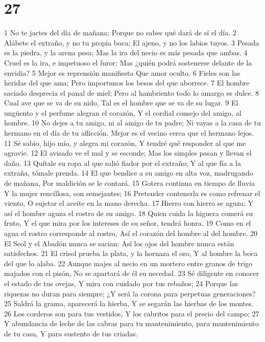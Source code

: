 \chapter{27}

1 No te jactes del día de mañana;
Porque no sabes qué dará de sí el día. 
2 Alábete el extraño, y no tu propia boca;
El ajeno, y no los labios tuyos.
3 Pesada es la piedra, y la arena pesa;
Mas la ira del necio es más pesada que ambas.
4 Cruel es la ira, e impetuoso el furor;
Mas ¿quién podrá sostenerse delante de la envidia?
5 Mejor es reprensión manifiesta
Que amor oculto.
6 Fieles son las heridas del que ama;
Pero importunos los besos del que aborrece.
7 El hombre saciado desprecia el panal de miel;
Pero al hambriento todo lo amargo es dulce.
8 Cual ave que se va de su nido,
Tal es el hombre que se va de su lugar.
9 El ungüento y el perfume alegran el corazón,
Y el cordial consejo del amigo, al hombre.
10 No dejes a tu amigo, ni al amigo de tu padre;
Ni vayas a la casa de tu hermano en el día de tu aflicción.
Mejor es el vecino cerca que el hermano lejos.
11 Sé sabio, hijo mío, y alegra mi corazón,
Y tendré qué responder al que me agravie.
12 El avisado ve el mal y se esconde;
Mas los simples pasan y llevan el daño.
13 Quítale su ropa al que salió fiador por el extraño;
Y al que fía a la extraña, tómale prenda.
14 El que bendice a su amigo en alta voz, madrugando de mañana,
Por maldición se le contará.
15 Gotera continua en tiempo de lluvia
Y la mujer rencillosa, son semejantes;
16 Pretender contenerla es como refrenar el viento,
O sujetar el aceite en la mano derecha.
17 Hierro con hierro se aguza;
Y así el hombre aguza el rostro de su amigo.
18 Quien cuida la higuera comerá su fruto,
Y el que mira por los intereses de su señor, tendrá honra.
19 Como en el agua el rostro corresponde al rostro,
Así el corazón del hombre al del hombre.
20 El Seol y el Abadón nunca se sacian;
Así los ojos del hombre nunca están satisfechos.
21 El crisol prueba la plata, y la hornaza el oro,
Y al hombre la boca del que lo alaba. 
22 Aunque majes al necio en un mortero entre granos de trigo majados con el pisón,
No se apartará de él su necedad.
23 Sé diligente en conocer el estado de tus ovejas,
Y mira con cuidado por tus rebaños;
24 Porque las riquezas no duran para siempre;
¿Y será la corona para perpetuas generaciones?
25 Saldrá la grama, aparecerá la hierba,
Y se segarán las hierbas de los montes.
26 Los corderos son para tus vestidos,
Y los cabritos para el precio del campo;
27 Y abundancia de leche de las cabras para tu mantenimiento, para mantenimiento de tu casa,
Y para sustento de tus criadas.


